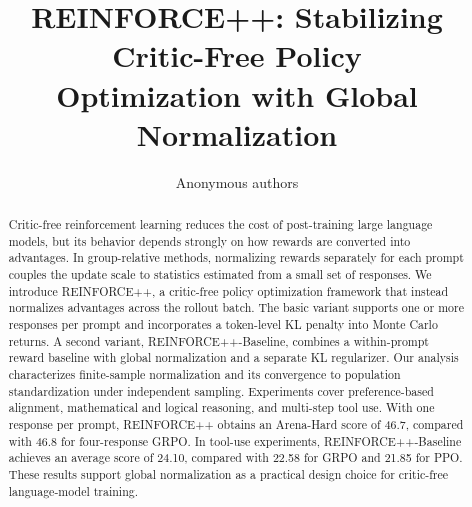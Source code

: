 \documentclass{article}
\title{REINFORCE++: Stabilizing Critic-Free Policy\\Optimization with Global Normalization}
\author{Anonymous authors}
\begin{document}
\maketitle
\begin{abstract}
Critic-free reinforcement learning reduces the cost of post-training large language models, but its behavior depends strongly on how rewards are converted into advantages. In group-relative methods, normalizing rewards separately for each prompt couples the update scale to statistics estimated from a small set of responses. We introduce REINFORCE++, a critic-free policy optimization framework that instead normalizes advantages across the rollout batch. The basic variant supports one or more responses per prompt and incorporates a token-level KL penalty into Monte Carlo returns. A second variant, REINFORCE++-Baseline, combines a within-prompt reward baseline with global normalization and a separate KL regularizer. Our analysis characterizes finite-sample normalization and its convergence to population standardization under independent sampling. Experiments cover preference-based alignment, mathematical and logical reasoning, and multi-step tool use. With one response per prompt, REINFORCE++ obtains an Arena-Hard score of 46.7, compared with 46.8 for four-response GRPO. In tool-use experiments, REINFORCE++-Baseline achieves an average score of 24.10, compared with 22.58 for GRPO and 21.85 for PPO. These results support global normalization as a practical design choice for critic-free language-model training.
\end{abstract}





\FloatBarrier



\clearpage



\clearpage
\appendix

\end{document}
